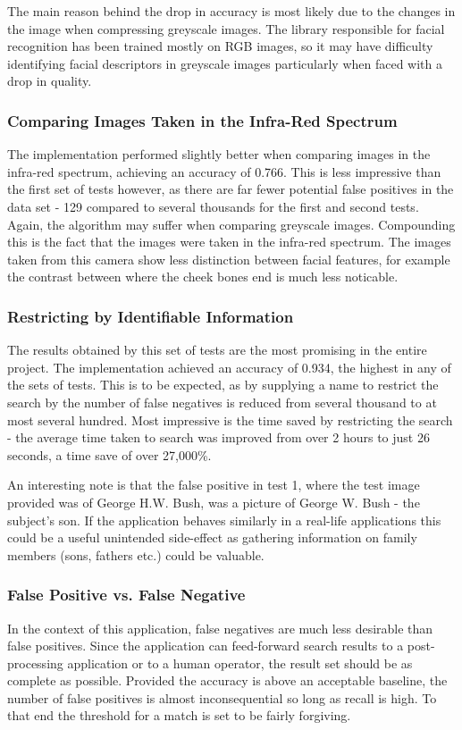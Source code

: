 \documentclass[12pt]{article}
\begin{document}
The main reason behind the drop in accuracy is most likely due to the changes in the image when compressing greyscale images. The library responsible for facial recognition has been trained mostly on RGB images, so it may have difficulty identifying facial descriptors in greyscale images particularly when faced with a drop in quality.

\subsubsection{Comparing Images Taken in the Infra-Red Spectrum}
The implementation performed slightly better when comparing images in the infra-red spectrum, achieving an accuracy of 0.766. This is less impressive than the first set of tests however, as there are far fewer potential false positives in the data set - 129 compared to several thousands for the first and second tests. Again, the algorithm may suffer when comparing greyscale images. Compounding this is the fact that the images were taken in the infra-red spectrum. The images taken from this camera show less distinction between facial features, for example the contrast between where the cheek bones end is much less noticable.

\subsubsection{Restricting by Identifiable Information}
The results obtained by this set of tests are the most promising in the entire project. The implementation achieved an accuracy of 0.934, the highest in any of the sets of tests. This is to be expected, as by supplying a name to restrict the search by the number of false negatives is reduced from several thousand to at most several hundred. Most impressive is the time saved by restricting the search - the average time taken to search was improved from over 2 hours to just 26 seconds, a time save of over 27,000\%.

An interesting note is that the false positive in test 1, where the test image provided was of George H.W. Bush, was a picture of George W. Bush - the subject's son. If the application behaves similarly in a real-life applications this could be a useful unintended side-effect as gathering information on family members (sons, fathers etc.) could be valuable.

\subsubsection{False Positive vs. False Negative}
In the context of this application, false negatives are much less desirable than false positives. Since the application can feed-forward search results to a post-processing application or to a human operator, the result set should be as complete as possible. Provided the accuracy is above an acceptable baseline, the number of false positives is almost inconsequential so long as recall is high. To that end the threshold for a match is set to be fairly forgiving.
\end{document}
